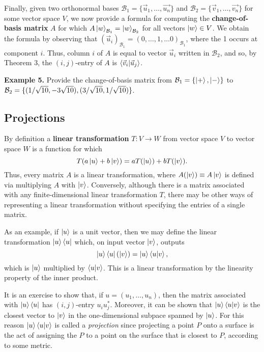 \documentclass [12pt]{article}
\theoremstyle{definition}
\begin{document}
Finally, given two orthonormal bases $\mathcal{B}_1=\{\vec{u}_1,\ldots,\vec{u_n}\}$ and $\mathcal{B}_2=\{\vec{v}_1,\ldots,\vec{v_n}\}$ for some vector space $V$,
we now provide a formula for computing the \textbf{change-of-basis matrix} $A$ for which $A\ket{w}_{\mathcal{B}_1} = \ket{w}_{\mathcal{B}_2}$ for all vectors $\ket{w}\in V$. 
We obtain the formula by observing that $(\vec{u}_i)_{\mathcal{B}_1}=(0,\ldots,1,\ldots 0)_{\mathcal{B}_1}$, where the 1 occurs at component $i$. Thus, column $i$ of $A$ is 
equal to vector $\vec{u}_i$ written in $\mathcal{B}_2$, and so, by Theorem 3,  the $(i,j)$-entry of $A$ is $\braket{\vec{v}_i|\vec{u}_j}$. 

\newpage
\textbf{Example 5.} Provide the change-of-basis matrix from $\mathcal{B}_1=\{\ket{+},\ket{-}\}$ to\\
 $\mathcal{B}_2=\{(1/\sqrt{10},-3\/\sqrt{10}),(3/\sqrt{10},1/\sqrt{10})\}$.

\vspace{3.0in}





\subsection*{Projections}
By definition a \textbf{linear transformation} $T:V\rightarrow W$ from vector space $V$ to vector space $W$ is a function for which 
\[T(a\ket{u} + b\ket{v}) = aT(\ket{u}) + bT(\ket{v}).\]
Thus, every matrix $A$ is a linear transformation, where $A(\ket{v}) \equiv A\ket{v}$ is defined via multiplying $A$ with $\ket{v}$. Conversely, although there is a matrix
associated with any finite-dimensional linear
transformation $T$, there may be other ways of representing a linear transformation without specifying the entries of a single matrix. 

As an example, if $\ket{u}$ is a unit vector, then we may define the linear transformation $\ket{u}\bra{u}$ which, on input vector $\ket{v}$, outputs
\[\ket{u}\bra{u}(\ket{v}) = \ket{u}\braket{u|v},\]
which is $\ket{u}$ multiplied by $\braket{u|v}$. This is a linear transformation by the linearity property of the inner product.

It is an exercise to show that, if $u=(u_1,\ldots,u_n)$, then the matrix associated with $\ket{u}\bra{u}$ has $(i,j)$-entry $u_iu_j^*$. Moreover, it can be shown
that $\ket{u}\braket{u|v}$ is the closest vector to $\ket{v}$ in the one-dimensional subpace spanned by $\ket{u}$. For this reason $\ket{u}\braket{u|v}$ is
 called a \textit{projection} since projecting a point $P$ onto a surface is the act of assigning the $P$ to a point on the surface that is closest to $P$, according to 
 some metric. 
\end{document}
